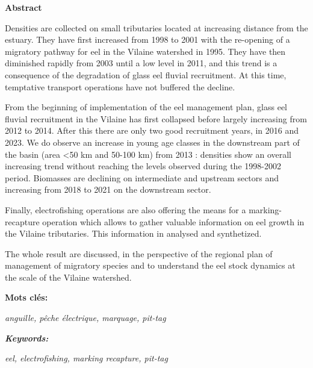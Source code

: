 \documentclass[10pt,twocolumn,titlepage,twoside]{article}\usepackage[]{graphicx}\usepackage[]{color}
\begin{document}
\begin{tcolorbox}
   \vspace{8mm}
    
   \textbf{Abstract}\par
   
    \vspace{8mm}
    
\begin{itshape}
  Densities are collected on small tributaries located at increasing distance
  from the estuary. They have first increased from 1998 to 2001  with the re-opening of a
  migratory pathway for eel in the Vilaine watershed in 1995. They have then
  diminished rapidly from 2003 until a low level in 2011, and
  this trend is a consequence of the degradation of glass eel fluvial
  recruitment. At this
  time, temptative transport operations have not buffered the decline.
  
  From the beginning of implementation of the eel management plan, glass eel
  fluvial recruitment in the Vilaine has first collapsed before largely
  increasing from 2012 to 2014. After this there are only two good recruitment
  years, in 2016 and 2023.
  We do observe an increase in young age classes in the downstream part of the
  basin (area <50 km and 50-100 km) from 2013 : densities show an overall increasing trend
  without reaching the levels observed during the 1998-2002 period. Biomasses are declining on
  intermediate and upstream sectors and increasing from 2018 to 2021 on
  the downstream sector. 
    
  Finally, electrofishing operations are also offering the means for a
  marking-recapture operation which allows to gather valuable information on
 eel growth in the Vilaine tributaries. This information in analysed and
 synthetized. 
 
 The whole result are discussed, in the perspective of the regional plan of
 management of migratory species and to understand the eel stock dynamics at the
 scale of the Vilaine watershed.
\end{itshape}




    \vspace{8mm}
    \textbf{Mots clés:}\par
     \textit{anguille, pêche électrique, marquage, pit-tag}\par 
    \vspace{8mm}    
     \textbf{\textit{Keywords:}}\par
     \textit{eel, electrofishing, marking recapture, pit-tag}  
\end{tcolorbox}
\end{document}
